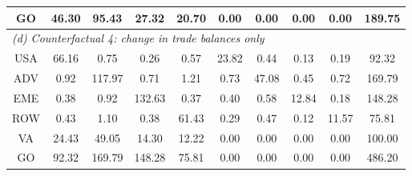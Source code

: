\begin{table}[p]
\begin{center}
\begin{tabular}{cccccccccc}
GO& 46.30& 95.43& 27.32& 20.70& 0.00& 0.00& 0.00& 0.00& 189.75\\
\midrule
\multicolumn{10}{l}{\textit{(d) Counterfactual 4: change in trade balances only}}\\
USA& 66.16& 0.75& 0.26& 0.57& 23.82& 0.44& 0.13& 0.19& 92.32 \\
ADV& 0.92& 117.97& 0.71& 1.21& 0.73& 47.08& 0.45& 0.72& 169.79 \\
EME& 0.38& 0.92& 132.63& 0.37& 0.40& 0.58& 12.84& 0.18& 148.28 \\
ROW& 0.43& 1.10& 0.38& 61.43& 0.29& 0.47& 0.12& 11.57& 75.81 \\
VA& 24.43& 49.05& 14.30& 12.22& 0.00& 0.00& 0.00& 0.00& 100.00\\
GO& 92.32& 169.79& 148.28& 75.81& 0.00& 0.00& 0.00& 0.00& 486.20\\
\bottomrule
\end{tabular}
\normalsize
\end{center}
\end{table}

